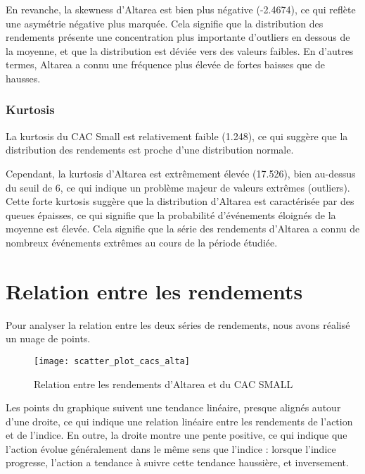 \documentclass[a4paper, 12pt]{report}
\begin{document}
En revanche, la skewness d'Altarea est bien plus négative (-2.4674), ce qui reflète une asymétrie négative plus marquée. Cela signifie que la distribution des rendements présente une concentration plus importante d'outliers en dessous de la moyenne, et que la distribution est déviée vers des valeurs faibles. En d'autres termes, Altarea a connu une fréquence plus élevée de fortes baisses que de hausses.

\subsubsection{Kurtosis}
\noindent
La kurtosis du CAC Small est relativement faible (1.248), ce qui suggère que la distribution des rendements est proche d'une distribution normale.

Cependant, la kurtosis d'Altarea  est extrêmement élevée (17.526), bien au-dessus du seuil de 6, ce qui indique un problème majeur de valeurs extrêmes (outliers). Cette forte kurtosis suggère que la distribution d'Altarea est caractérisée par des queues épaisses, ce qui signifie que la probabilité d'événements éloignés de la moyenne est élevée. Cela signifie que la série des rendements d'Altarea  a connu de nombreux événements extrêmes au cours de la période étudiée.

\section{Relation entre les rendements}
\noindent
Pour analyser la relation entre les deux séries de rendements, nous avons réalisé un nuage de points. 
\begin{figure}[H]
\begin{center}
	\texttt{[image: scatter\_plot\_cacs\_alta]}
	\caption{Relation entre les rendements d'Altarea et du CAC SMALL}
\end{center}
\end{figure}
Les points du graphique suivent une tendance linéaire, presque alignés autour d'une droite, ce qui indique une relation linéaire entre les rendements de l'action et de l'indice. 
En outre, la droite montre une pente positive, ce qui indique que l'action évolue généralement dans le même sens que l'indice : lorsque l'indice progresse, l'action a tendance à suivre cette tendance haussière, et inversement.
\end{document}

